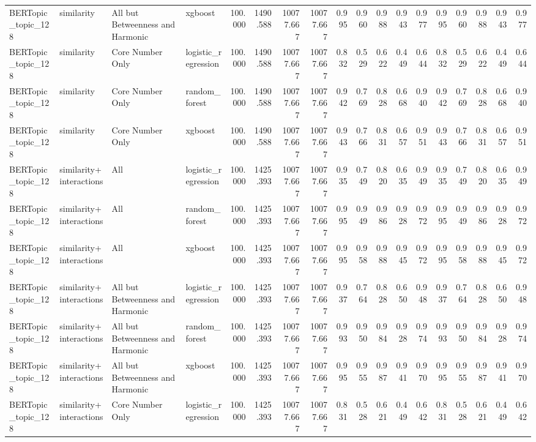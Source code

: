 \begin{tabular}{llllrrrrrrrrrrrrrr}
BERTopic_topic_128 & similarity & All but Betweenness and Harmonic & xgboost & 100.000 & 1490.588 & 10077.667 & 10077.667 & 0.995 & 0.960 & 0.988 & 0.943 & 0.977 & 0.995 & 0.960 & 0.988 & 0.943 & 0.977 \\
BERTopic_topic_128 & similarity & Core Number Only & logistic_regression & 100.000 & 1490.588 & 10077.667 & 10077.667 & 0.832 & 0.529 & 0.622 & 0.449 & 0.644 & 0.832 & 0.529 & 0.622 & 0.449 & 0.644 \\
BERTopic_topic_128 & similarity & Core Number Only & random_forest & 100.000 & 1490.588 & 10077.667 & 10077.667 & 0.942 & 0.769 & 0.828 & 0.668 & 0.940 & 0.942 & 0.769 & 0.828 & 0.668 & 0.940 \\
BERTopic_topic_128 & similarity & Core Number Only & xgboost & 100.000 & 1490.588 & 10077.667 & 10077.667 & 0.943 & 0.766 & 0.831 & 0.657 & 0.951 & 0.943 & 0.766 & 0.831 & 0.657 & 0.951 \\
BERTopic_topic_128 & similarity+interactions & All & logistic_regression & 100.000 & 1425.393 & 10077.667 & 10077.667 & 0.935 & 0.749 & 0.820 & 0.635 & 0.949 & 0.935 & 0.749 & 0.820 & 0.635 & 0.949 \\
BERTopic_topic_128 & similarity+interactions & All & random_forest & 100.000 & 1425.393 & 10077.667 & 10077.667 & 0.995 & 0.949 & 0.986 & 0.928 & 0.972 & 0.995 & 0.949 & 0.986 & 0.928 & 0.972 \\
BERTopic_topic_128 & similarity+interactions & All & xgboost & 100.000 & 1425.393 & 10077.667 & 10077.667 & 0.995 & 0.958 & 0.988 & 0.945 & 0.972 & 0.995 & 0.958 & 0.988 & 0.945 & 0.972 \\
BERTopic_topic_128 & similarity+interactions & All but Betweenness and Harmonic & logistic_regression & 100.000 & 1425.393 & 10077.667 & 10077.667 & 0.937 & 0.764 & 0.828 & 0.650 & 0.948 & 0.937 & 0.764 & 0.828 & 0.650 & 0.948 \\
BERTopic_topic_128 & similarity+interactions & All but Betweenness and Harmonic & random_forest & 100.000 & 1425.393 & 10077.667 & 10077.667 & 0.993 & 0.950 & 0.984 & 0.928 & 0.974 & 0.993 & 0.950 & 0.984 & 0.928 & 0.974 \\
BERTopic_topic_128 & similarity+interactions & All but Betweenness and Harmonic & xgboost & 100.000 & 1425.393 & 10077.667 & 10077.667 & 0.995 & 0.955 & 0.987 & 0.941 & 0.970 & 0.995 & 0.955 & 0.987 & 0.941 & 0.970 \\
BERTopic_topic_128 & similarity+interactions & Core Number Only & logistic_regression & 100.000 & 1425.393 & 10077.667 & 10077.667 & 0.831 & 0.528 & 0.621 & 0.449 & 0.642 & 0.831 & 0.528 & 0.621 & 0.449 & 0.642 \\

\end{tabular}

